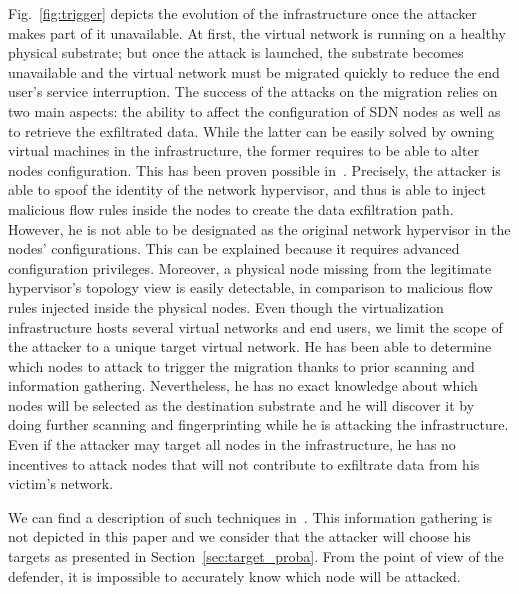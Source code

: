 \label{sec:attack_model}
Fig.~\ref{fig:trigger} depicts the evolution of the infrastructure once the attacker makes part of it unavailable. 
At first, the virtual network is running on a healthy physical substrate; but once the attack is launched, the substrate becomes unavailable and the virtual network must be migrated quickly to reduce the end user's service interruption.
The success of the attacks on the migration relies on two main aspects: the ability to affect the configuration of SDN nodes as well as  to retrieve the exfiltrated data.
While the latter can be easily solved by owning virtual machines in the infrastructure, the former requires to be able to alter nodes configuration. This has been proven possible in~\cite{Taxonomy_Hizver2015, Bokani2015, attain-Ujcich2017}.
Precisely, the attacker is able to spoof the identity of the network hypervisor, and thus is able to inject malicious flow rules inside the nodes to create the data exfiltration path. 
However, he is not able to be designated as the original network hypervisor in the nodes' configurations. 
This can be explained because it requires advanced configuration privileges. Moreover, a physical node missing from the legitimate hypervisor's topology view is easily detectable, in comparison to malicious flow rules injected inside the physical nodes.
Even though the virtualization infrastructure hosts several virtual networks and end users, we limit the scope of the attacker to a unique target virtual network. 
He has been able to determine which nodes to attack to trigger the migration thanks to prior scanning and information gathering. 
Nevertheless, he has no exact knowledge about which nodes will be selected as the destination substrate and he will discover it by doing further scanning and fingerprinting  while he is attacking the infrastructure.  
Even if the attacker may target all nodes in the infrastructure, he has no incentives to attack nodes that will not contribute to exfiltrate data from his victim's network. 

We can find a description of such techniques in~\cite{Hong2015,Sphinx-Dhawan2015}.
This information gathering is not depicted in this paper and we consider that the attacker will choose his targets as presented in Section~\ref{sec:target_proba}.
From the point of view of the defender, it is impossible to accurately know which node will be attacked.

